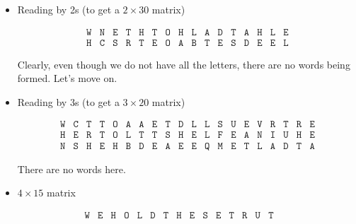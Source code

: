 {\begin{enumerate}
    \begin{itemize}
    \item Reading by 2s (to get a \(2\times 30\) matrix) 
    \begin{center}
    \vspace*{-1cm}
    \[
    \begin{array}{cccccccccccccccc}
    \texttt{W} & \texttt{N} & \texttt{E} & \texttt{T} & \texttt{H} & \texttt{T} & \texttt{O} & \texttt{H} & \texttt{L} & \texttt{A} & \texttt{D} & \texttt{T} & \texttt{A} & \texttt{H} & \texttt{L} & \texttt{E}  \\
    \texttt{H} & \texttt{C} & \texttt{S} & \texttt{R} & \texttt{T} & \texttt{E} & \texttt{O} & \texttt{A} & \texttt{B} & \texttt{T} & \texttt{E} & \texttt{S} & \texttt{D} & \texttt{E} & \texttt{E} & \texttt{L} 
    \end{array}
    \]
    \vspace*{-1cm}
    \end{center}
    Clearly, even though we do not have all the letters, there are no words being formed. Let's move on.
        \item Reading by 3s (to get a \(3\times 20\) matrix) 
    \begin{center}
    \vspace*{-1cm}
    \[
    \begin{array}{cccccccccccccccccccc}
    \texttt{W} & \texttt{C} & \texttt{T} & \texttt{T} & \texttt{O} & \texttt{A} & \texttt{A} & \texttt{E} & \texttt{T} & \texttt{D} & \texttt{L} & \texttt{L} & \texttt{S} & \texttt{U} & \texttt{E} & \texttt{V} & \texttt{R} & \texttt{T} & \texttt{R} & \texttt{E} \\
    
    \texttt{H} & \texttt{E} & \texttt{R} & \texttt{T} & \texttt{O} & \texttt{L} & \texttt{T} & \texttt{T} & \texttt{S} & \texttt{H} & \texttt{E} & \texttt{L} & \texttt{F} & \texttt{E} & \texttt{A} & \texttt{N} & \texttt{I} & \texttt{U} & \texttt{H} & \texttt{E} \\
    
    \texttt{N} & \texttt{S} & \texttt{H} & \texttt{E} & \texttt{H} & \texttt{B} & \texttt{D} & \texttt{E} & \texttt{A} & \texttt{E} & \texttt{E} & \texttt{Q} & \texttt{M} & \texttt{E} & \texttt{T} & \texttt{L} & \texttt{A} & \texttt{D} & \texttt{T} & \texttt{A} 
    \end{array}
    \]
    \vspace*{-1cm}
    \end{center}
    There are no words here.
    \item \(4 \times 15\) matrix
    \end{itemize}
        \begin{center}
    \vspace*{-1cm}
    \[
    \begin{array}{ccccccccccccccc}
    \texttt{W} & \texttt{E} & \texttt{H} & \texttt{O} & \texttt{L} & \texttt{D} & \texttt{T} & \texttt{H} & \texttt{E} & \texttt{S} & \texttt{E} & \texttt{T} & \texttt{R} & \texttt{U} & \texttt{T} \\
    

\end{array}\]
\end{center}
\end{enumerate}}
